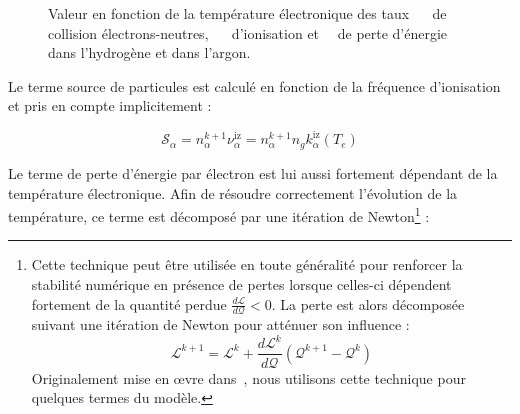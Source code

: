 \begin{refsection}
\begin{figure}[!htbp]
    \centering
    \caption{Valeur en fonction de la température électronique des taux
    ~~ de collision électrons-neutres,
    ~~ d'ionisation et~~ de perte
    d'énergie dans l'hydrogène et dans l'argon.}
    \label{3-tauxcollision}
\end{figure}

Le terme source de particules est calculé en fonction de la fréquence
d'ionisation et pris en compte implicitement :

\begin{equation*}
\mathcal{S}_{\alpha}=n_\alpha^{k+1} \nu_\alpha^\text{iz}=n_\alpha^{k+1} n_g
k_{\alpha}^\text{iz}(T_e)
\end{equation*}

Le terme de perte d'énergie par électron est lui aussi fortement dépendant de la
température électronique. Afin de
résoudre correctement l'évolution de la température, ce terme est décomposé par une itération
de Newton\footnote{Cette technique peut être utilisée en toute généralité pour
renforcer la stabilité numérique en présence de pertes lorsque celles-ci
dépendent fortement de la quantité perdue 
$\frac{d\mathcal L}{d\mathcal Q}<0$.
La perte est alors décomposée suivant une itération de Newton pour atténuer son
influence :
\begin{equation*}
\mathcal L^{k+1}=\mathcal L^{k}+\frac{d\mathcal L^{k}}{d\mathcal Q}(\mathcal
Q^{k+1}-\mathcal Q^k) \end{equation*}
Originalement mise en \oe vre dans~\parencite{HagelaarImpl}, nous utilisons cette technique pour quelques
termes du modèle.} :


\end{refsection}

